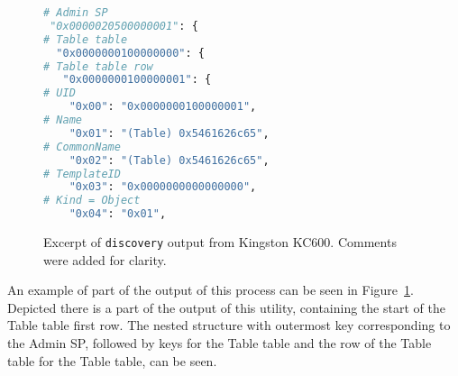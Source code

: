\begin{figure}
    \centering
\begin{lstlisting}[language=Python]
# Admin SP
 "0x0000020500000001": {
# Table table
  "0x0000000100000000": {
# Table table row
   "0x0000000100000001": {
# UID
    "0x00": "0x0000000100000001",
# Name
    "0x01": "(Table) 0x5461626c65",
# CommonName
    "0x02": "(Table) 0x5461626c65",
# TemplateID
    "0x03": "0x0000000000000000",
# Kind = Object
    "0x04": "0x01",
\end{lstlisting}

    \caption{Excerpt of \texttt{discovery} output from Kingston KC600. Comments were added for clarity.}
    \label{fig:discovery_example}
\end{figure}

An example of part of the output of this process can be seen in Figure~\ref{fig:discovery_example}. Depicted there is a part of the output of this utility, containing the start of the Table table first row. The nested structure with outermost key corresponding to the Admin SP, followed by keys for the Table table and the row of the Table table for the Table table, can be seen. %

